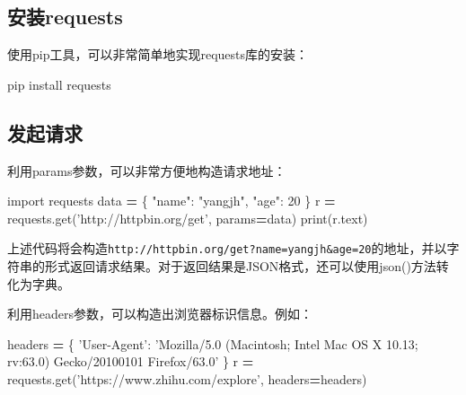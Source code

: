 \documentclass[]{ctexbook}
\newenvironment{Shaded}{\begin{snugshade}}{\end{snugshade}}
\newcommand{\BuiltInTok}[1]{#1}
\newcommand{\DecValTok}[1]{\textcolor[rgb]{0.00,0.00,0.81}{#1}}
\newcommand{\ExtensionTok}[1]{#1}
\newcommand{\ImportTok}[1]{#1}
\newcommand{\NormalTok}[1]{#1}
\newcommand{\OperatorTok}[1]{\textcolor[rgb]{0.81,0.36,0.00}{\textbf{#1}}}
\newcommand{\StringTok}[1]{\textcolor[rgb]{0.31,0.60,0.02}{#1}}
\begin{document}
\hypertarget{ux5b89ux88c5requests}{%
\subsection{安装requests}\label{ux5b89ux88c5requests}}

使用pip工具，可以非常简单地实现requests库的安装：

\begin{Shaded}
\begin{Highlighting}[]
\ExtensionTok{pip}\NormalTok{ install requests}
\end{Highlighting}
\end{Shaded}

\hypertarget{ux53d1ux8d77ux8bf7ux6c42}{%
\subsection{发起请求}\label{ux53d1ux8d77ux8bf7ux6c42}}

利用params参数，可以非常方便地构造请求地址：

\begin{Shaded}
\begin{Highlighting}[]
\ImportTok{import}\NormalTok{ requests}
\NormalTok{data }\OperatorTok{=}\NormalTok{ \{}
    \StringTok{"name"}\NormalTok{: }\StringTok{"yangjh"}\NormalTok{,}
    \StringTok{"age"}\NormalTok{: }\DecValTok{20}
\NormalTok{\}}
\NormalTok{r }\OperatorTok{=}\NormalTok{ requests.get(}\StringTok{'http://httpbin.org/get'}\NormalTok{, params}\OperatorTok{=}\NormalTok{data)}
\BuiltInTok{print}\NormalTok{(r.text)}
\end{Highlighting}
\end{Shaded}

上述代码将会构造\texttt{http://httpbin.org/get?name=yangjh\&age=20}的地址，并以字符串的形式返回请求结果。对于返回结果是JSON格式，还可以使用json()方法转化为字典。

利用headers参数，可以构造出浏览器标识信息。例如：

\begin{Shaded}
\begin{Highlighting}[]
\NormalTok{headers }\OperatorTok{=}\NormalTok{ \{}
    \StringTok{'User-Agent'}\NormalTok{: }\StringTok{'Mozilla/5.0 (Macintosh; Intel Mac OS X 10.13; rv:63.0) Gecko/20100101 Firefox/63.0'}
\NormalTok{\}}
\NormalTok{r }\OperatorTok{=}\NormalTok{ requests.get(}\StringTok{'https://www.zhihu.com/explore'}\NormalTok{, headers}\OperatorTok{=}\NormalTok{headers)}
\end{Highlighting}
\end{Shaded}
\end{document}
